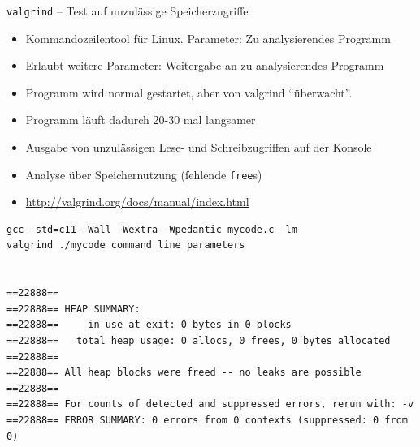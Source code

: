 
\begin{frame}[t,plain]
\titlepage
\end{frame}


\begin{frame}[fragile]{\texttt{valgrind} -- Test auf unzulässige Speicherzugriffe}
%
\begin{itemize}
\item Kommandozeilentool für Linux. Parameter: Zu analysierendes Programm
\item Erlaubt weitere Parameter: Weitergabe an zu analysierendes Programm
\item Programm wird normal gestartet, aber von valgrind \enquote{überwacht}.
\item Programm läuft dadurch 20-30 mal langsamer
\item Ausgabe von unzulässigen Lese- und Schreibzugriffen auf der Konsole
\item Analyse über Speichernutzung (fehlende \texttt{free}s)
\item \url{http://valgrind.org/docs/manual/index.html}
\end{itemize}
%
\end{frame}


\begin{frame}[fragile]
%
\begin{cmdbox}
\begin{verbatim}
gcc -std=c11 -Wall -Wextra -Wpedantic mycode.c -lm
valgrind ./mycode command line parameters


==22888== 
==22888== HEAP SUMMARY:
==22888==     in use at exit: 0 bytes in 0 blocks
==22888==   total heap usage: 0 allocs, 0 frees, 0 bytes allocated
==22888== 
==22888== All heap blocks were freed -- no leaks are possible
==22888== 
==22888== For counts of detected and suppressed errors, rerun with: -v
==22888== ERROR SUMMARY: 0 errors from 0 contexts (suppressed: 0 from 0)
\end{verbatim}
\end{cmdbox}
%
\end{frame}


